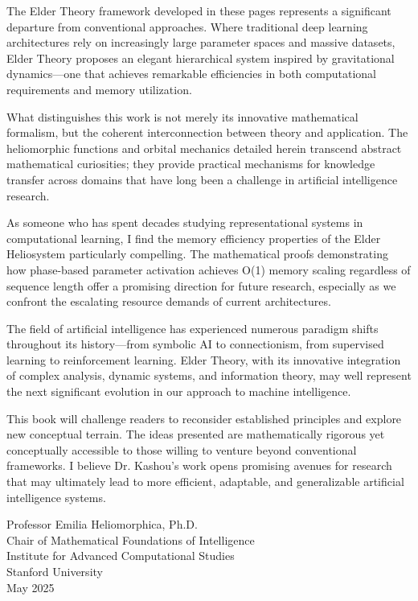 \documentclass[11pt,twoside]{book}
\begin{document}
The Elder Theory framework developed in these pages represents a significant departure from conventional approaches. Where traditional deep learning architectures rely on increasingly large parameter spaces and massive datasets, Elder Theory proposes an elegant hierarchical system inspired by gravitational dynamics—one that achieves remarkable efficiencies in both computational requirements and memory utilization.

What distinguishes this work is not merely its innovative mathematical formalism, but the coherent interconnection between theory and application. The heliomorphic functions and orbital mechanics detailed herein transcend abstract mathematical curiosities; they provide practical mechanisms for knowledge transfer across domains that have long been a challenge in artificial intelligence research.

As someone who has spent decades studying representational systems in computational learning, I find the memory efficiency properties of the Elder Heliosystem particularly compelling. The mathematical proofs demonstrating how phase-based parameter activation achieves O(1) memory scaling regardless of sequence length offer a promising direction for future research, especially as we confront the escalating resource demands of current architectures.

The field of artificial intelligence has experienced numerous paradigm shifts throughout its history—from symbolic AI to connectionism, from supervised learning to reinforcement learning. Elder Theory, with its innovative integration of complex analysis, dynamic systems, and information theory, may well represent the next significant evolution in our approach to machine intelligence.

This book will challenge readers to reconsider established principles and explore new conceptual terrain. The ideas presented are mathematically rigorous yet conceptually accessible to those willing to venture beyond conventional frameworks. I believe Dr. Kashou's work opens promising avenues for research that may ultimately lead to more efficient, adaptable, and generalizable artificial intelligence systems.

\vspace{1cm}
\begin{flushright}
Professor Emilia Heliomorphica, Ph.D.\\
Chair of Mathematical Foundations of Intelligence\\
Institute for Advanced Computational Studies\\
Stanford University\\
May 2025
\end{flushright}
\end{document}
